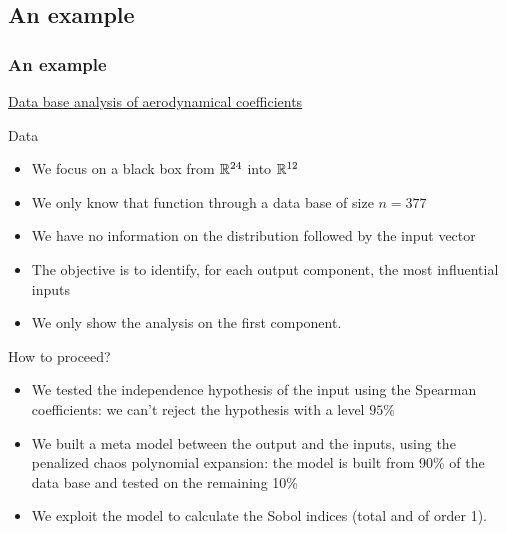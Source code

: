 \documentclass[8pt]{beamer}
\begin{document}
\subsection{An example}


\begin{frame}
  \frametitle{An example}
\small
\underline{Data base analysis of aerodynamical coefficients}

\begin{block}{Data}
  \begin{itemize}
  \item We focus on a black box from ${\mathbb R}^{24}$ into ${\mathbb R}^{12}$
  \item We only know that function through a data base of size $n=377$
  \item We have no information on the distribution followed by the input vector
  \item The objective is to identify, for each output component, the most influential inputs
  \item \alert{We only show the analysis on the first component.}
  \end{itemize}
  \end{block}

\begin{block}{How to proceed?}
  \begin{itemize}
  \item We tested the independence hypothesis of the input using the Spearman coefficients: we can't reject the hypothesis with a level $95\%$
  \item We built a meta model between the output and the inputs, using the penalized chaos polynomial expansion: the model is built from  90\% of the data base and tested on the remaining 10\%
  \item We exploit the model to calculate the Sobol indices (total and of order 1).
  \end{itemize}
\end{block}

\end{frame}
\end{document}
